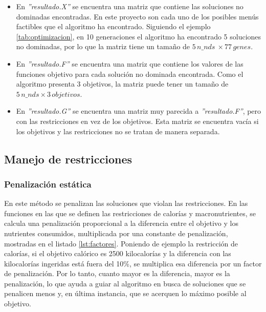\begin{itemize}
    \item En \textit{''resultado.X''} se encuentra una matriz que contiene las soluciones no dominadas encontradas. En este proyecto son cada uno de los posibles menús factibles que el algoritmo ha encontrado. Siguiendo el ejemplo \ref{tab:optimizacion}, en 10 generaciones el algoritmo ha encontrado 5 soluciones no dominadas, por lo que la matriz tiene un tamaño de \(5 \, n\_nds\ \times 77 \, genes\).
    \item En \textit{''resultado.F''} se encuentra una matriz que contiene los valores de las funciones objetivo para cada solución no dominada encontrada. Como el algoritmo presenta 3 objetivos, la matriz puede tener un tamaño de \(5 \, n\_nds \times 3 \, objetivos\).
    \item En \textit{''resultado.G''} se encuentra una matriz muy parecida a \textit{''resultado.F''}, pero con las restricciones en vez de los objetivos. Esta matriz se encuentra vacía si los objetivos y las restricciones no se tratan de manera separada.
\end{itemize}

\subsection{Manejo de restricciones}
\label{ch:manejo-restricciones}

\subsubsection{Penalización estática}
\label{ch:penalizacion-estatica}

En este método se penalizan las soluciones que violan las restricciones. En las funciones en las que se definen las restricciones de calorías y macronutrientes, se calcula una penalización proporcional a la diferencia entre el objetivo y los nutrientes consumidos, multiplicada por una constante de penalización, mostradas en el listado \ref{lst:factores}. Poniendo de ejemplo la restricción de calorías, si el objetivo calórico es 2500 kilocalorías y la diferencia con las kilocalorías ingeridas está fuera del 10\%, se multiplica esa diferencia por un factor de penalización. Por lo tanto, cuanto mayor es la diferencia, mayor es la penalización, lo que ayuda a guiar al algoritmo en busca de soluciones que se penalicen menos y, en última instancia, que se acerquen lo máximo posible al objetivo.

